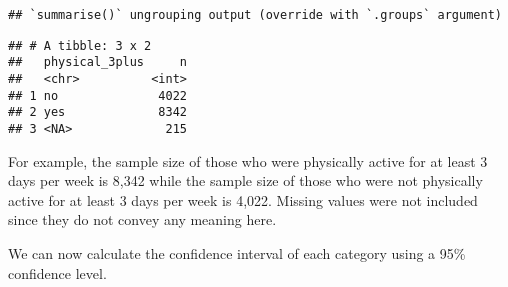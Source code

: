 \documentclass[
]{article}
\newenvironment{Shaded}{\begin{snugshade}}{\end{snugshade}}
\newcommand{\CommentTok}[1]{\textcolor[rgb]{0.56,0.35,0.01}{\textit{#1}}}
\newcommand{\DecValTok}[1]{\textcolor[rgb]{0.00,0.00,0.81}{#1}}
\newcommand{\FloatTok}[1]{\textcolor[rgb]{0.00,0.00,0.81}{#1}}
\newcommand{\KeywordTok}[1]{\textcolor[rgb]{0.13,0.29,0.53}{\textbf{#1}}}
\newcommand{\NormalTok}[1]{#1}
\newcommand{\OperatorTok}[1]{\textcolor[rgb]{0.81,0.36,0.00}{\textbf{#1}}}
\newcommand{\StringTok}[1]{\textcolor[rgb]{0.31,0.60,0.02}{#1}}
\begin{document}
\begin{verbatim}
## `summarise()` ungrouping output (override with `.groups` argument)
\end{verbatim}

\begin{verbatim}
## # A tibble: 3 x 2
##   physical_3plus     n
##   <chr>          <int>
## 1 no              4022
## 2 yes             8342
## 3 <NA>             215
\end{verbatim}

For example, the sample size of those who were physically active for at
least 3 days per week is 8,342 while the sample size of those who were
not physically active for at least 3 days per week is 4,022. Missing
values were not included since they do not convey any meaning here.

We can now calculate the confidence interval of each category using a
95\% confidence level.

\begin{Shaded}
\end{Shaded}
\end{document}
